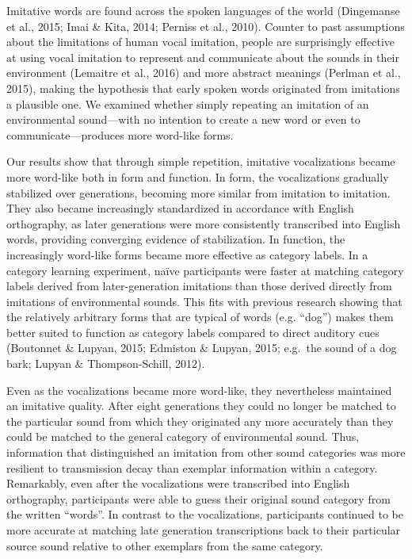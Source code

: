 \documentclass[english,floatsintext,man]{apa6}
\theoremstyle{definition}
\theoremstyle{definition}
\theoremstyle{remark}
\begin{document}
Imitative words are found across the spoken languages of the world
(Dingemanse et al., 2015; Imai \& Kita, 2014; Perniss et al., 2010).
Counter to past assumptions about the limitations of human vocal
imitation, people are surprisingly effective at using vocal imitation to
represent and communicate about the sounds in their environment
(Lemaitre et al., 2016) and more abstract meanings (Perlman et al.,
2015), making the hypothesis that early spoken words originated from
imitations a plausible one. We examined whether simply repeating an
imitation of an environmental sound---with no intention to create a new
word or even to communicate---produces more word-like forms.

Our results show that through simple repetition, imitative vocalizations
became more word-like both in form and function. In form, the
vocalizations gradually stabilized over generations, becoming more
similar from imitation to imitation. They also became increasingly
standardized in accordance with English orthography, as later
generations were more consistently transcribed into English words,
providing converging evidence of stabilization. In function, the
increasingly word-like forms became more effective as category labels.
In a category learning experiment, naïve participants were faster at
matching category labels derived from later-generation imitations than
those derived directly from imitations of environmental sounds. This
fits with previous research showing that the relatively arbitrary forms
that are typical of words (e.g. \enquote{dog}) makes them better suited
to function as category labels compared to direct auditory cues
(Boutonnet \& Lupyan, 2015; Edmiston \& Lupyan, 2015; e.g.~the sound of
a dog bark; Lupyan \& Thompson-Schill, 2012).

Even as the vocalizations became more word-like, they nevertheless
maintained an imitative quality. After eight generations they could no
longer be matched to the particular sound from which they originated any
more accurately than they could be matched to the general category of
environmental sound. Thus, information that distinguished an imitation
from other sound categories was more resilient to transmission decay
than exemplar information within a category. Remarkably, even after the
vocalizations were transcribed into English orthography, participants
were able to guess their original sound category from the written
\enquote{words}. In contrast to the vocalizations, participants
continued to be more accurate at matching late generation transcriptions
back to their particular source sound relative to other exemplars from
the same category.
\end{document}
